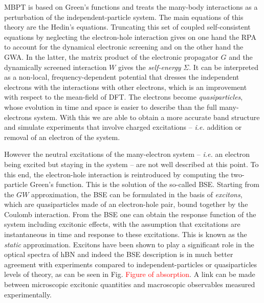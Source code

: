 \acrshort{MBPT} is based on Green's functions and treats the many-body interactions as a perturbation of the independent-particle system. The main equations of this theory are the Hedin's equations.\cite{hedin1965new} Truncating this set of coupled self-consistent equations by neglecting the electron-hole interaction gives on one hand the \acrfull{RPA} to account for the dynamical electronic screening and on the other hand the \acrfull{GWA}. In the latter, the matrix product of the electronic propagator $G$ and the dynamically screened interaction $W$ gives the \textit{self-energy} $\Sigma$. It can be interpreted as a non-local, frequency-dependent potential that dresses the independent electrons with the interactions with other electrons, which is an improvement with respect to the mean-field of \acrshort{DFT}. The electrons become \textit{quasiparticles}, whose evolution in time and space is easier to describe than the full many-electrons system.
With this we are able to obtain a more accurate band structure and simulate experiments that involve charged excitations -- \textit{i.e.} addition or removal of an electron of the system. 

However the neutral excitations of the many-electron system -- \textit{i.e.} an electron being excited but staying in the system -- are not well described at this point. To this end, the electron-hole interaction is reintroduced by computing the two-particle Green's function. This is the solution of the so-called \acrfull{BSE}.\cite{blase2020bethe} Starting from the $GW$ approximation, the \acrshort{BSE} can be formulated in the basis of \textit{excitons}, which are quasiparticles made of an electron-hole pair, bound together by the Coulomb interaction. From the \acrshort{BSE} one can obtain the response function of the system including excitonic effects, with the assumption that excitations are instantaneous in time and response to these excitations. This is known as the \textit{static} approximation. Excitons have been shown to play a significant role in the optical spectra of \acrshort{hBN} and indeed the \acrshort{BSE} description is in much better agreement with experiments compared to independent-particles or quasiparticles levels of theory, as can be seen in Fig. \textcolor{red}{Figure of absorption}. A link can be made between microscopic excitonic quantities and macroscopic observables measured experimentally. 

